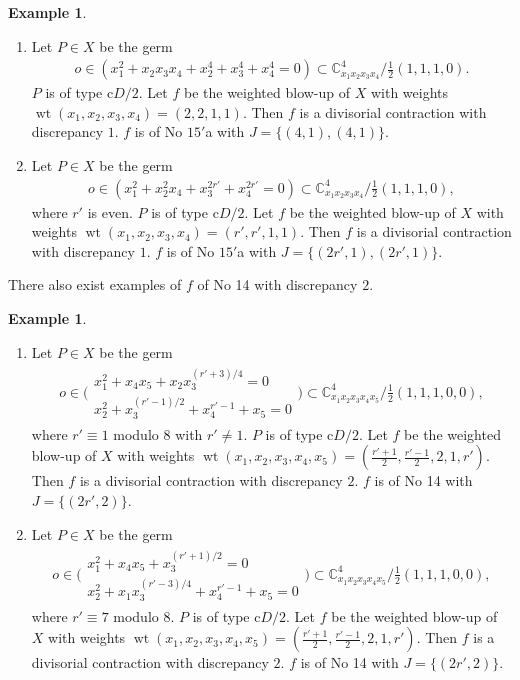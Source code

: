 \documentclass[a4paper,11pt]{amsart}
\theoremstyle{definition}
\newtheorem{example}[theorem]{Example}
\theoremstyle{remark}
\numberwithin{equation}{section}
\newcommand{\bC}{{\mathbb C}}
\newcommand{\wt}{\operatorname{wt}}
\begin{document}
\begin{example}\label{exl:cD/2_15}
\begin{enumerate}
\item
Let $P \in X$ be the germ
\begin{align*}
o \in (x_1^2+x_2x_3x_4+x_2^4+x_3^4+x_4^4=0) 
\subset \bC^4_{x_1x_2x_3x_4} /\frac{1}{2}(1,1,1,0).
\end{align*}
$P$ is of type c$D/2$.
Let $f$ be the weighted blow-up of $X$
with weights $\wt(x_1,x_2,x_3,x_4)=(2,2,1,1)$.
Then $f$ is a divisorial contraction with discrepancy $1$.
$f$ is of No $\textrm{15}'$a with $J=\{(4,1),(4,1)\}$.
\item
Let $P \in X$ be the germ
\begin{align*}
o \in (x_1^2+x_2^2x_4+x_3^{2r'}+x_4^{2r'}=0) 
\subset \bC^4_{x_1x_2x_3x_4} /\frac{1}{2}(1,1,1,0),
\end{align*}
where $r'$ is even.
$P$ is of type c$D/2$.
Let $f$ be the weighted blow-up of $X$
with weights $\wt(x_1,x_2,x_3,x_4)=(r',r',1,1)$.
Then $f$ is a divisorial contraction with discrepancy $1$.
$f$ is of No $\textrm{15}'$a with $J=\{(2r',1),(2r',1)\}$.
\end{enumerate}
\end{example}

There also exist examples of $f$ of No 14 with discrepancy $2$.

\begin{example}\label{exl:cD/2_14-2}
\begin{enumerate}
\item
Let $P \in X$ be the germ 
\begin{align*}
o \in \bigg(
\begin{array}{c}
x_1^2+x_4x_5+x_2x_3^{(r'+3)/4}=0 \\
x_2^2+x_3^{(r'-1)/2}+x_4^{r'-1}+x_5=0
\end{array}
\bigg)
\subset \bC^4_{x_1x_2x_3x_4x_5} /\frac{1}{2}(1,1,1,0,0),
\end{align*}
where $r'\equiv1$ modulo $8$ with $r'\neq1$.
$P$ is of type c$D/2$.
Let $f$ be the weighted blow-up of $X$
with weights $\wt(x_1,x_2,x_3,x_4,x_5)=(\frac{r'+1}{2},\frac{r'-1}{2},2,1,r')$.
Then $f$ is a divisorial contraction with discrepancy $2$.
$f$ is of No 14 with $J=\{(2r',2)\}$.
\item
Let $P \in X$ be the germ
\begin{align*}
o \in \bigg(
\begin{array}{c}
x_1^2+x_4x_5+x_3^{(r'+1)/2}=0 \\
x_2^2+x_1x_3^{(r'-3)/4}+x_4^{r'-1}+x_5=0
\end{array}
\bigg)
\subset \bC^4_{x_1x_2x_3x_4x_5} /\frac{1}{2}(1,1,1,0,0),
\end{align*}
where $r'\equiv7$ modulo $8$.
$P$ is of type c$D/2$.
Let $f$ be the weighted blow-up of $X$
with weights $\wt(x_1,x_2,x_3,x_4,x_5)=(\frac{r'+1}{2},\frac{r'-1}{2},2,1,r')$.
Then $f$ is a divisorial contraction with discrepancy $2$.
$f$ is of No 14 with $J=\{(2r',2)\}$.
\end{enumerate}
\end{example}
\end{document}
